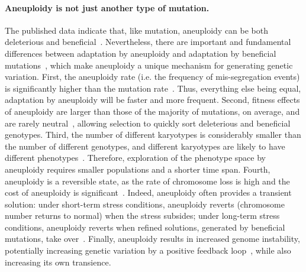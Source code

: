 \documentclass[12pt]{extarticle}
\begin{document}
\paragraph*{Aneuploidy is not just another type of mutation.}
The published data indicate that, like mutation, aneuploidy can be both deleterious and beneficial~\citep{Pavelka2010, Sheltzer2011}.
Nevertheless, there are important and fundamental differences between adaptation by aneuploidy
and adaptation by beneficial mutations~\citep{Yona2015}, which make aneuploidy a unique mechanism for generating genetic
variation.
First, the aneuploidy rate (i.e. the frequency of mis-segregation events) is significantly higher than the
mutation rate~\citep{Santaguida2015review}.
Thus, everything else being equal, adaptation by aneuploidy will be faster and more frequent.
Second, fitness effects of aneuploidy are larger than those of the majority of mutations, on average, and are rarely
neutral~\citep{Pavelka2010, Yona2012, Sunshine2015}, allowing selection to quickly sort deleterious and beneficial genotypes.
Third, the number of different karyotypes is considerably smaller than the number of different genotypes, and different karyotypes are likely to have different phenotypes~\citep{Pavelka2010}.
Therefore, exploration of the phenotype space by aneuploidy requires smaller populations and a shorter time span.
Fourth, aneuploidy is a reversible state, as the rate of chromosome loss is high and the cost of aneuploidy is significant~\citep{Niwa2006}.
Indeed, aneuploidy often provides a transient solution: under short-term stress conditions, aneuploidy reverts (chromosome number returns to normal) when the stress subsides; under long-term stress conditions, aneuploidy reverts when refined solutions, generated by beneficial mutations, take over~\citep{Yona2012}.
Finally, aneuploidy results in increased genome instability, potentially increasing genetic variation by a positive feedback loop~\citep{Rancati2013, Bouchonville2009, Zhu2012}, while also increasing its own transience.

\end{document}
